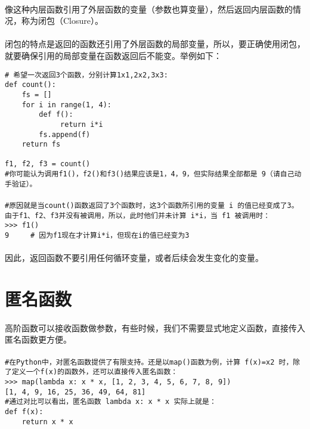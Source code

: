 \documentclass{article}
\begin{document}
\begin{CJK}{UTF8}{gbsn}
\paragraph{}
像这种内层函数引用了外层函数的变量（参数也算变量），然后返回内层函数的情况，称为闭包（Closure）。
\paragraph{}
闭包的特点是返回的函数还引用了外层函数的局部变量，所以，要正确使用闭包，就要确保引用的局部变量在函数返回后不能变。举例如下：
\begin{verbatim}
# 希望一次返回3个函数，分别计算1x1,2x2,3x3:
def count():
    fs = []
    for i in range(1, 4):
        def f():
             return i*i
        fs.append(f)
    return fs

f1, f2, f3 = count()
#你可能认为调用f1()，f2()和f3()结果应该是1，4，9，但实际结果全部都是 9（请自己动手验证）。
\end{verbatim}
\paragraph{}
\begin{verbatim}
#原因就是当count()函数返回了3个函数时，这3个函数所引用的变量 i 的值已经变成了3。由于f1、f2、f3并没有被调用，所以，此时他们并未计算 i*i，当 f1 被调用时：
>>> f1()
9     # 因为f1现在才计算i*i，但现在i的值已经变为3
\end{verbatim}
\paragraph{}
因此，返回函数不要引用任何循环变量，或者后续会发生变化的变量。
\section{匿名函数}
\paragraph{}
高阶函数可以接收函数做参数，有些时候，我们不需要显式地定义函数，直接传入匿名函数更方便。
\paragraph{}
\begin{verbatim}
#在Python中，对匿名函数提供了有限支持。还是以map()函数为例，计算 f(x)=x2 时，除了定义一个f(x)的函数外，还可以直接传入匿名函数：
>>> map(lambda x: x * x, [1, 2, 3, 4, 5, 6, 7, 8, 9])
[1, 4, 9, 16, 25, 36, 49, 64, 81]
#通过对比可以看出，匿名函数 lambda x: x * x 实际上就是：
def f(x):
    return x * x
\end{verbatim}

\end{CJK}
\end{document}
